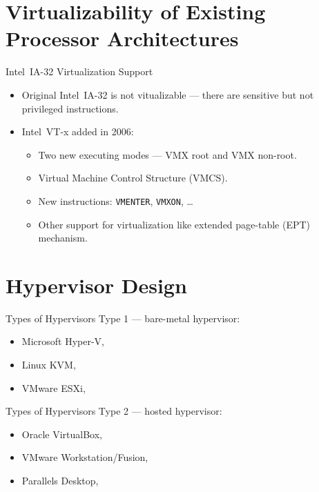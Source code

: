 \section{Virtualizability of Existing Processor Architectures}

\begin{frame}{Intel\reg~IA-32 Virtualization Support}
\begin{itemize}
\item Original Intel\reg~IA-32 is not vitualizable --- there are sensitive but
  not privileged instructions.
\item Intel\reg~VT-x added in 2006:
  \begin{itemize}
  \item Two new executing modes --- VMX root and VMX non-root.
  \item Virtual Machine Control Structure (VMCS).
  \item New instructions: \texttt{VMENTER}, \texttt{VMXON}, \dots
  \item Other support for virtualization like extended page-table (EPT)
    mechanism.
  \end{itemize}
\end{itemize}
\end{frame}


\section{Hypervisor Design}

\begin{frame}{Types of Hypervisors}
Type 1 --- bare-metal hypervisor:
\begin{itemize}
\item Microsoft Hyper-V,
\item Linux KVM,
\item VMware ESXi,
\end{itemize}
\vfill
\centering
{}
\end{frame}

\begin{frame}{Types of Hypervisors}
Type 2 --- hosted hypervisor:
\begin{itemize}
\item Oracle VirtualBox,
\item VMware Workstation/Fusion,
\item Parallels Desktop,
\end{itemize}
\vfill
\centering
{}
\end{frame}

